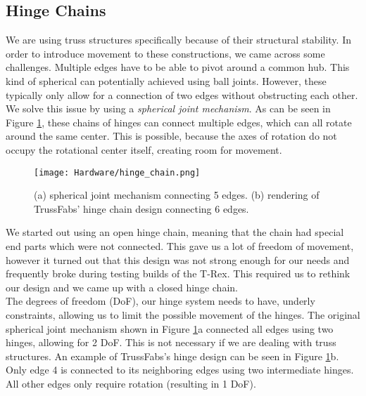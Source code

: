 \subsection{Hinge Chains}
We are using truss structures specifically because of their structural stability. In order to introduce movement to these constructions, we came across some challenges. Multiple edges have to be able to pivot around a common hub. This kind of spherical can potentially achieved using ball joints. However, these typically only allow for a connection of two edges without obstructing each other.\\
We solve this issue by using a \textit{spherical joint mechanism}. As can be seen in Figure \ref{fig:hinge_chain}, these chains of hinges can connect multiple edges, which can all rotate around the same center. This is possible, because the axes of rotation do not occupy the rotational center itself, creating room for movement.\\
\begin{figure}[h!]
    \texttt{[image: Hardware/hinge\_chain.png]}
    \centering
    \caption{(a) spherical joint mechanism connecting 5 edges. (b) rendering of TrussFabs' hinge chain design connecting 6 edges.}
    \label{fig:hinge_chain}
\end{figure}
We started out using an open hinge chain, meaning that the chain had special end parts which were not connected. This gave us a lot of freedom of movement, however it turned out that this design was not strong enough for our needs and frequently broke during testing builds of the T-Rex. This required us to rethink our design and we came up with a closed hinge chain.\\
The degrees of freedom (DoF), our hinge system needs to have, underly constraints, allowing us to limit the possible movement of the hinges. The original spherical joint mechanism shown in Figure \ref{fig:hinge_chain}a connected all edges using two hinges, allowing for 2 DoF. This is not necessary if we are dealing with truss structures. An example of TrussFabs's hinge design can be seen in Figure \ref{fig:hinge_chain}b. Only edge 4 is connected to its neighboring edges using two intermediate hinges. All other edges only require rotation (resulting in 1 DoF).

